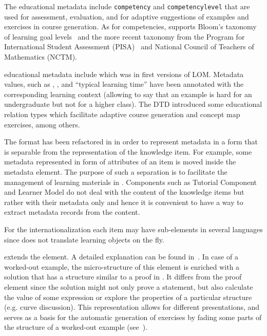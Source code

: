 The educational metadata include {\tt{competency}} and {\tt{competencylevel}} that are used
for assessment, evaluation, and for adaptive suggestions of examples and exercises in
course generation.  As for competencies, {\activemath} supports Bloom's taxonomy of
learning goal levels~\cite{bloom56} and the more recent taxonomy from the Program for
International Student Assessment (PISA)~\cite{klieme04} and National Council of Teachers
of Mathematics (NCTM).

{\activemath} educational metadata include {} which was in
first versions of LOM.  Metadata values, such as {},
{}, and ``typical learning time'' have been annotated with the
corresponding learning context (allowing to say that an example is hard for an
undergraduate but not for a higher class).  The {\activemath} DTD introduced some
educational relation types which facilitate adaptive course generation and concept map
exercises, among others.

The {\omdoc} format has been refactored in {\activemath} in order to represent metadata in
a form that is separable from the representation of the knowledge item. For example, some
metadata represented in form of attributes of an item is moved inside the metadata
element. The purpose of such a separation is to facilitate the management of learning
materials in {\activemath}. Components such as Tutorial Component and Learner Model do not
deal with the content of the knowledge items but rather with their metadata only and hence
it is convenient to have a way to extract metadata records from the content.
 
For the internationalization each {\omdoc} item may have sub-elements in several languages
since {\activemath} does not translate learning objects on the fly.

{\activemath} extends the {\omdoc} {} element. A detailed explanation can
be found in~\cite{Melisetal-FadedEx-ITS04-2004}.  In case of a worked-out example, the
micro-structure of this element is enriched with a solution that has a structure similar
to a proof in {\omdoc}.  It differs from the proof element since the solution might not
only prove a statement, but also calculate the value of some expression or explore the
properties of a particular structure (e.g. curve discussion).  This representation allows
for different presentations, and serves as a basis for the automatic generation of
exercises by fading some parts of the structure of a worked-out example
(see~\cite{Melisetal-FadedEx-ITS04-2004}).

